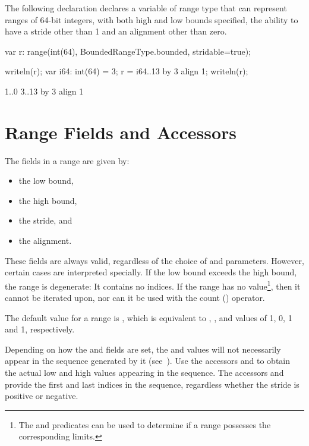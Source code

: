 \begin{example}
The following declaration declares a variable 
of range type that can represent ranges of 64-bit integers, with both
high and low bounds specified, the ability to have a stride other
than 1 and an alignment other than zero.
\begin{chapelpre}
\end{chapelpre}
\begin{chapel}
var r: range(int(64), BoundedRangeType.bounded, stridable=true);
\end{chapel}
\begin{chapelpost}
writeln(r);
var i64: int(64) = 3;
r = i64..13 by 3 align 1;
writeln(r);
\end{chapelpost}
\begin{chapeloutput}
1..0
3..13 by 3 align 1
\end{chapeloutput}
\end{example}

\section{Range Fields and Accessors}
\label{Range_Fields}

The fields in a range are given by:
\begin{itemize}
\item[\chpl{low}] the low bound,
\item[\chpl{high}] the high bound,
\item[\chpl{stride}] the stride, and
\item[\chpl{alignment}] the alignment.
\end{itemize}
These fields are always valid, regardless of the choice of 
and  parameters.  However, certain cases are interpreted
specially.  If the low bound exceeds the high bound, the range is degenerate: It contains no
indices.  If the range has no  value\footnote{The 
and  predicates can be used to determine if a range possesses the
corresponding limits.}, then it cannot be iterated
upon, nor can it be used with the count (\chpl{\#}) operator.

The default value for a range is , which is equivalent to , , 
and  values of 1, 0, 1 and 1, respectively.

Depending on how the  and  fields are set,
the  and  values will not necessarily appear in the
sequence generated by it (see~).  Use the
accessors  and  to obtain the actual low and
high values appearing in the sequence.  The accessors  and  provide
the first and last indices in the sequence, regardless whether the stride is
positive or negative.  

